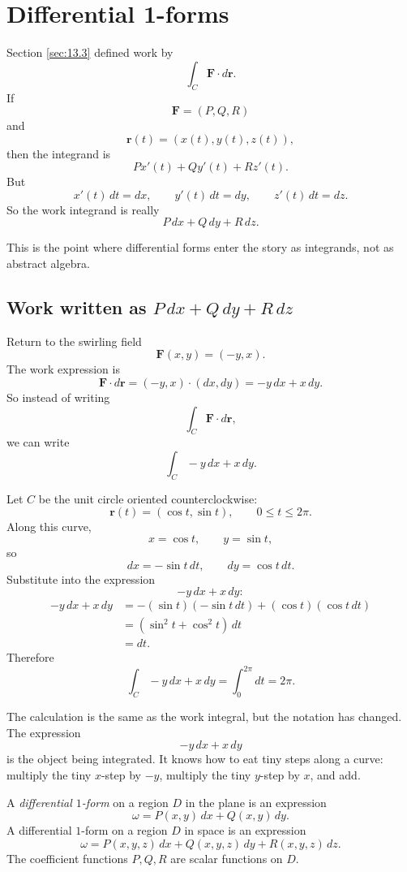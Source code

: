 \section{Differential 1-forms}
\label{sec:13.4}

Section \ref{sec:13.3} defined work by
\[
    \int_C \mathbf F\cdot d\mathbf r.
\]
If
\[
    \mathbf F=(P,Q,R)
\]
and
\[
    \mathbf r(t)=(x(t),y(t),z(t)),
\]
then the integrand is
\[
    P x'(t)+Q y'(t)+R z'(t).
\]
But
\[
    x'(t)\,dt=dx,\qquad y'(t)\,dt=dy,\qquad z'(t)\,dt=dz.
\]
So the work integrand is really
\[
    P\,dx+Q\,dy+R\,dz.
\]

This is the point where differential forms enter the story as integrands, not as
abstract algebra.

\subsection{Work written as \texorpdfstring{\(P\,dx+Q\,dy+R\,dz\)}{P dx + Q dy + R dz}}

Return to the swirling field
\[
    \mathbf F(x,y)=(-y,x).
\]
The work expression is
\[
    \mathbf F\cdot d\mathbf r
    =
    (-y,x)\cdot(dx,dy)
    =
    -y\,dx+x\,dy.
\]
So instead of writing
\[
    \int_C \mathbf F\cdot d\mathbf r,
\]
we can write
\[
    \int_C -y\,dx+x\,dy.
\]

Let \(C\) be the unit circle oriented counterclockwise:
\[
    \mathbf r(t)=(\cos t,\sin t),
    \qquad
    0\le t\le2\pi.
\]
Along this curve,
\[
    x=\cos t,\qquad y=\sin t,
\]
so
\[
    dx=-\sin t\,dt,
    \qquad
    dy=\cos t\,dt.
\]
Substitute into the expression
\[
    -y\,dx+x\,dy:
\]
\[
\begin{aligned}
-y\,dx+x\,dy
&=
-(\sin t)(-\sin t\,dt)+(\cos t)(\cos t\,dt)\\
&=
(\sin^2 t+\cos^2 t)\,dt\\
&=
dt.
\end{aligned}
\]
Therefore
\[
\boxed{
    \int_C -y\,dx+x\,dy
    =
    \int_0^{2\pi}dt
    =
    2\pi.
}
\]

The calculation is the same as the work integral, but the notation has changed.  The
expression
\[
    -y\,dx+x\,dy
\]
is the object being integrated.  It knows how to eat tiny steps along a curve:
multiply the tiny \(x\)-step by \(-y\), multiply the tiny \(y\)-step by \(x\), and add.

\begin{definition}
A \emph{differential \(1\)-form} on a region \(D\) in the plane is an expression
\[
\boxed{
    \omega=P(x,y)\,dx+Q(x,y)\,dy.
}
\]
A differential \(1\)-form on a region \(D\) in space is an expression
\[
\boxed{
    \omega=P(x,y,z)\,dx+Q(x,y,z)\,dy+R(x,y,z)\,dz.
}
\]
The coefficient functions \(P,Q,R\) are scalar functions on \(D\).
\end{definition}

